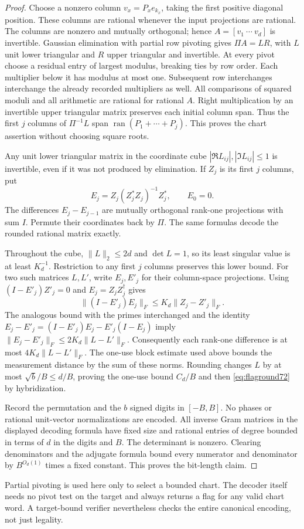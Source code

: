 \begin{proof}
Choose a nonzero column $v_x=P_xe_{k_x}$, taking the first positive
diagonal position. These columns are rational whenever the input
projections are rational. The columns
are nonzero and mutually orthogonal; hence $A=[v_1\ \cdots\ v_d]$
is invertible. Gaussian elimination with partial row pivoting gives
$\Pi A=LR$, with $L$ unit lower triangular and $R$ upper triangular
and invertible. At every pivot choose a residual entry of largest
modulus, breaking ties by row order. Each multiplier below it has
modulus at most one. Subsequent row interchanges interchange the
already recorded multipliers as well. All comparisons of squared
moduli and all arithmetic are rational for rational $A$.
Right multiplication by an invertible upper triangular matrix
preserves each initial column span. Thus the first $j$ columns of
$\Pi^{-1}L$ span $\operatorname{ran}(P_1+\cdots+P_j)$.
This proves the chart assertion without choosing square roots.

Any unit lower triangular matrix in the coordinate cube
$|\Re L_{ij}|,|\Im L_{ij}|\le1$ is invertible, even if it was not
produced by elimination. If $Z_j$ is its first $j$ columns, put
\[
 E_j=Z_j(Z_j^*Z_j)^{-1}Z_j^*,\qquad E_0=0.
\]
The differences $E_j-E_{j-1}$ are mutually orthogonal rank-one
projections with sum $I$. Permute their coordinates back by $\Pi$.
The same formulas decode the rounded rational matrix exactly.

Throughout the cube, $\|L\|_2\le2d$ and $\det L=1$, so its least
singular value is at least $K_d^{-1}$. Restriction to any first $j$
columns preserves this lower bound. For two such matrices $L,L'$,
write $E_j,E'_j$ for their column-space projections. Using
$(I-E'_j)Z'_j=0$ and $E_j=Z_jZ_j^\dagger$ gives
\[
 \|(I-E'_j)E_j\|_F\le K_d\|Z_j-Z'_j\|_F.
\]
The analogous bound with the primes interchanged and the identity
$E_j-E'_j=(I-E'_j)E_j-E'_j(I-E_j)$ imply
$\|E_j-E'_j\|_F\le2K_d\|L-L'\|_F$.
Consequently each rank-one difference is at most
$4K_d\|L-L'\|_F$. The one-use block estimate used above bounds the
measurement distance by the sum of these norms. Rounding changes
$L$ by at most $\sqrt b/B\le d/B$, proving the one-use bound
$C_d/B$ and then \eqref{eq:flaground72} by hybridization.

Record the permutation and the $b$ signed digits in $[-B,B]$.
No phases or rational unit-vector normalizations are encoded. All
inverse Gram matrices in the displayed decoding formula have fixed
size and rational entries of degree bounded in terms of $d$ in the
digits and $B$. The determinant is nonzero. Clearing denominators
and the adjugate formula bound every numerator and denominator by
$B^{O_d(1)}$ times a fixed constant. This proves the bit-length claim.
\end{proof}
Partial pivoting is used here only to select a bounded chart.
The decoder itself needs no pivot test on the target and always
returns a flag for any valid chart word. A target-bound verifier
nevertheless checks the entire canonical encoding, not just legality.

